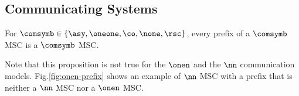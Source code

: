 \begin{comment}

Let $\msc = (\Events,\procrel,\lhd,\lambda) \in \MSCs$ and consider
$E \subseteq \Events$ such that $E$ is ${\le}$-\emph{downward-closed}, i.e,
for all $(e,f) \in {\le}$ such that $f \in E$, we also have $e \in E$.
Then, the MSC $(E,{\procrel} \cap (E \times E),{\lhd} \cap (E \times E),\lambda')$,
where $\lambda'$ is the restriction of $\Events$ to $E$, is called a \emph{prefix}
of $\msc$. In particular, the empty MSC is a prefix of $\msc$.
We denote the set of prefixes of $\msc$ by $\Pref{\msc}$.
This is extended to sets $L \subseteq \MSCs$ as expected, letting
$\Pref{L} = \bigcup_{\msc \in L} \Pref{\msc}$.

\smallskip

Let $\msc = (\Events,\procrel,\lhd,\lambda) \in \onenMSCs$ and consider
$E \subseteq \Events$ such that $E$ is ${\onenpartial}$-\emph{downward-closed}, i.e,
for all $(e,f) \in {\onenpartial}$ such that $f \in E$, we also have $e \in E$.
Then, the MSC $(E,{\procrel} \cap (E \times E),{\lhd} \cap (E \times E),\lambda')$,
where $\lambda'$ is the restriction of $\Events$ to $E$, is called a \emph{$\onen$ prefix} of $\msc$. We denote the set of $\onen$ prefixes of $\msc$ by $\Prefonen{\msc}$.

\smallskip

Let $\msc = (\Events,\procrel,\lhd,\lambda) \in \nnMSCs$ and consider
$E \subseteq \Events$ such that $E$ is ${\nnbowtieofmsc\msc}$-\emph{downward-closed}, i.e,
for all $(e,f) \in {\nnbowtieofmsc\msc}$ such that $f \in E$, we also have $e \in E$.
Then, the MSC $(E,{\procrel} \cap (E \times E),{\lhd} \cap (E \times E),\lambda')$,
where $\lambda'$ is the restriction of $\Events$ to $E$, is called a \emph{$\nn$ prefix} of $\msc$. We denote the set of $\nn$ prefixes of $\msc$ by $\Prefnn{\msc}$.

\end{comment}

\subsection{Communicating Systems}

\begin{proposition}
	\label{prop:prefixes}
	For $\comsymb \in \{\asy, \oneone, \co, \none, \rsc\}$, every prefix of a $\comsymb$ MSC is a $\comsymb$ MSC.
\end{proposition}

Note that this proposition is not true for the $\onen$ and the $\nn$ communication models. Fig.\ref{fig:onen-prefix} shows an example of $\nn$ MSC with a prefix that is neither a $\nn$ MSC nor a $\onen$ MSC.

